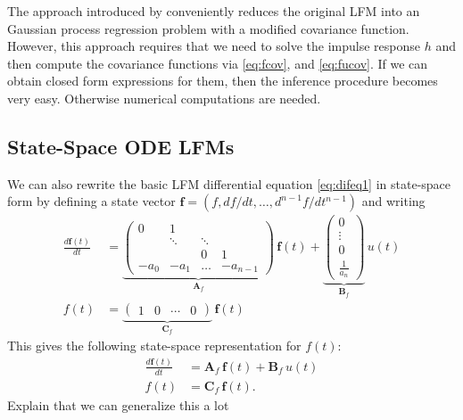 \documentclass[journal]{IEEEtran}
\newcommand{\simo}[1]{{\color{red}#1}}
\begin{document}
The approach introduced by
\cite{Alvarez+Lawrence:2009,Alvarez+Luengo+Lawrence:2013} conveniently
reduces the original LFM into an Gaussian process regression problem
with a modified covariance function. However, this approach requires
that we need to solve the impulse response $h$ and then compute the
covariance functions via \eqref{eq:fcov}, and \eqref{eq:fucov}.  If we can obtain closed form
expressions for them, then the inference procedure becomes very
easy. Otherwise numerical computations are needed.


\subsection{State-Space ODE LFMs}
%
We can also rewrite the basic LFM differential equation \eqref{eq:difeq1} in state-space form by defining a state vector $\mathbf{f} = (f, df/dt,\ldots,d^{n-1}f/dt^{n-1})$ and writing
%
\begin{equation}
\begin{split}
  \frac{d\mathbf{f}(t)}{dt}
  &= \underbrace{\begin{pmatrix}
       0             & 1      &        &       \\
                     & \ddots & \ddots &       \\
                     &         &  0    &     1 \\
   -a_0 & -a_1 & \hdots &  -a_{n-1}
  \end{pmatrix}}_{\mathbf{A}_f} \, \mathbf{f}(t)
  + \underbrace{\begin{pmatrix}
      0 \\
      \vdots \\
      0 \\
      \frac{1}{a_n}
  \end{pmatrix}}_{\mathbf{B}_f} \,
   u(t) \\
   f(t) &= \underbrace{\begin{pmatrix}
     1 & 0 & \cdots & 0
   \end{pmatrix}}_{\mathbf{C}_f} \, \mathbf{f}(t)
\end{split}
\label{eq:ss1}
\end{equation}
%
This gives the following state-space representation for $f(t)$:
%
\begin{equation}
\begin{split}
  \frac{d\mathbf{f}(t)}{dt}
  &= \mathbf{A}_f \, \mathbf{f}(t) + \mathbf{B}_f \, u(t) \\
  f(t) &= \mathbf{C}_f \, \mathbf{f}(t).
\end{split}
\label{eq:ssgen}
\end{equation}
%
\simo{Explain that we can generalize this a lot}
\end{document}
